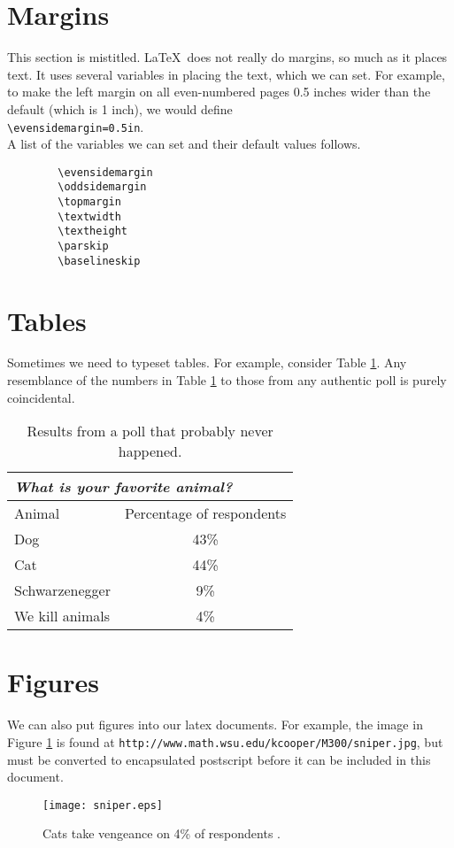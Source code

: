\documentclass[12pt]{article}
\begin{document}
	\section{Margins}
	This section is mistitled.  \LaTeX\ does not really do margins,
	so much as it places text.  It uses several variables in placing the
	text, which we can set.  For example, to make the left margin on
	all even-numbered pages 0.5 inches wider than the default (which is 
	1 inch), we would define\\
	\verb(\evensidemargin=0.5in(.\\
	A list of the variables we can set and their default values follows.
	\begin{verbatim}
		\evensidemargin
		\oddsidemargin
		\topmargin
		\textwidth
		\textheight
		\parskip
		\baselineskip
	\end{verbatim}
	
	\section{Tables}
	Sometimes we need to typeset tables.  For example, 
	consider Table \ref{animaltable}.  
	Any resemblance of the numbers in 
	Table \ref{animaltable} to those from any authentic poll is purely coincidental.
	\begin{table}
		\begin{center}
			\caption{\label{animaltable}
				Results from a poll that probably never happened.}
			\begin{tabular}{||l|c||}
				\hline
				\cline{1-2}
				\multicolumn{2}{||l||}{{\it What is your favorite animal?}}\\
				\hline
				Animal & Percentage of respondents\\
				\hline
				Dog & 43\%\\
				Cat & 44\%\\
				Schwarzenegger & 9\%\\
				We kill animals & 4\%\\
				\hline
				\hline
			\end{tabular}
		\end{center}
	\end{table}
	
	\section{Figures}
	We can also put figures into our latex documents.  For example, the
	image in Figure \ref{sniper} is found at 
	{\tt http://www.math.wsu.edu/kcooper/M300/sniper.jpg}, but must
	be converted to encapsulated postscript before it can be included
	in this document.
	\begin{figure}[ht]
		\begin{center}
			\texttt{[image: sniper.eps]}
			\caption{\label{sniper}
				Cats take vengeance on 4\% of respondents \cite{calvin}.}
			\vfill
		\end{center}
	\end{figure}
	
\end{document}
